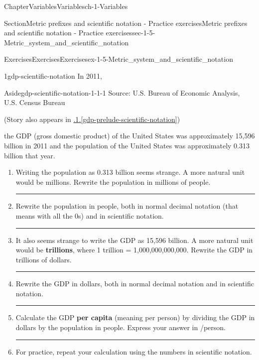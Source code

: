 \documentclass[twoside,11pt,]{book}
\newcommand{\xreffont}{\relax}
\newcommand{\terminology}[1]{\textbf{#1}}
\newlength{\workspacestrutwidth}
\numberwithin{equation}{section}
\begin{document}
\begin{chapterptx}{Chapter}{Variables}{}{Variables}{}{}{ch-1-Variables}
\begin{sectionptx}{Section}{Metric prefixes and scientific notation - Practice exercises}{}{Metric prefixes and scientific notation - Practice exercises}{}{}{sec-1-5-Metric_system_and_scientific_notation}
%
%
\typeout{************************************************}
\typeout{************************************************}
%
\begin{exercises-subsection-numberless}{Exercises}{Exercises}{}{Exercises}{}{}{ex-1-5-Metric_system_and_scientific_notation}
\begin{divisionexercise}{1}{}{}{gdp-scientific-notation}%
In 2011, \begin{aside}{Aside}{}{gdp-scientific-notation-1-1-1}%
Source: U.S. Bureau of Economic Analysis, U.S. Census Bureau%
\par
(Story also appears in \hyperref[gdp-prelude-scientific-notation]{{\xreffont 0.8.1}.{\xreffont\ref{gdp-prelude-scientific-notation}}})%
\end{aside}
 the GDP (gross domestic product) of the United States was approximately \textdollar{}15,596 billion in 2011 and the population of the United States was approximately 0.313 billion that year.%
\begin{enumerate}[label=(\alph*),ref=\alph*]%
\item{}Writing the population as 0.313 billion seems strange. A more natural unit would be millions. Rewrite the population in millions of people.%
\par\rule{\workspacestrutwidth}{1.5cm}%
\item{}Rewrite the population in people, both in normal decimal notation (that means with all the 0s) and in scientific notation.%
\par\rule{\workspacestrutwidth}{1.5cm}%
\item{}It also seems strange to write the GDP as \textdollar{}15,596 billion. A more natural unit would be \terminology{trillions}, where 1 trillion = 1,000,000,000,000. Rewrite the GDP in trillions of dollars.%
\par\rule{\workspacestrutwidth}{1.5cm}%
\item{}Rewrite the GDP in dollars, both in normal decimal notation and in scientific notation.%
\par\rule{\workspacestrutwidth}{1.5cm}%
\item{}Calculate the GDP \terminology{per capita} (meaning per person) by dividing the GDP in dollars by the population in people. Express your answer in \textdollar{}\slash{}person.%
\par\rule{\workspacestrutwidth}{1.5cm}%
\item{}For practice, repeat your calculation using the numbers in scientific notation.%
\par

\end{enumerate}
\end{divisionexercise}
\end{exercises-subsection-numberless}
\end{sectionptx}
\end{chapterptx}
\end{document}
